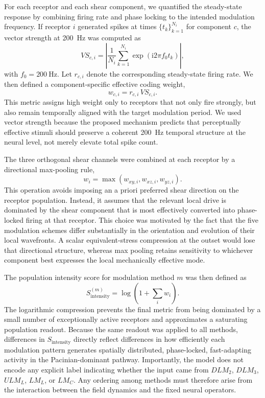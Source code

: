 \documentclass[pdflatex, sn-nature]{sn-jnl}
\theoremstyle{thmstyleone}%
\theoremstyle{thmstyletwo}%
\theoremstyle{thmstylethree}%
\begin{document}
For each receptor and each shear component, we quantified the steady-state response by combining firing rate and phase locking to the intended modulation frequency. If receptor $i$ generated spikes at times $\{t_k\}_{k=1}^{N_i}$ for component $c$, the vector strength at \qty{200}{\hertz} was computed as
\begin{equation}
    VS_{c,i}=\left|\frac{1}{N_i}\sum_{k=1}^{N_i} \exp\!\left(\mathrm{i}2\pi f_0 t_k\right)\right|,
\end{equation}
with $f_0=\qty{200}{\hertz}$. Let $r_{c,i}$ denote the corresponding steady-state firing rate. We then defined a component-specific effective coding weight,
\begin{equation}
    w_{c,i}=r_{c,i}\,VS_{c,i}.
\end{equation}
This metric assigns high weight only to receptors that not only fire strongly, but also remain temporally aligned with the target modulation period. We used vector strength because the proposed mechanism predicts that perceptually effective stimuli should preserve a coherent \qty{200}{\hertz} temporal structure at the neural level, not merely elevate total spike count.

The three orthogonal shear channels were combined at each receptor by a directional max-pooling rule,
\begin{equation}
    w_i=\max\left(w_{xy,i},w_{xz,i},w_{yz,i}\right).
\end{equation}
This operation avoids imposing an a priori preferred shear direction on the receptor population. Instead, it assumes that the relevant local drive is dominated by the shear component that is most effectively converted into phase-locked firing at that receptor. This choice was motivated by the fact that the five modulation schemes differ substantially in the orientation and evolution of their local wavefronts. A scalar equivalent-stress compression at the outset would lose that directional structure, whereas max pooling retains sensitivity to whichever component best expresses the local mechanically effective mode.

The population intensity score for modulation method $m$ was then defined as
\begin{equation}
    S^{(m)}_{\mathrm{intensity}}=\log\!\left(1+\sum_i w_i\right).
\end{equation}
The logarithmic compression prevents the final metric from being dominated by a small number of exceptionally active receptors and approximates a saturating population readout. Because the same readout was applied to all methods, differences in $S_{\mathrm{intensity}}$ directly reflect differences in how efficiently each modulation pattern generates spatially distributed, phase-locked, fast-adapting activity in the Pacinian-dominant pathway. Importantly, the model does not encode any explicit label indicating whether the input came from $DLM_2$, $DLM_3$, $ULM_L$, $LM_L$, or $LM_C$. Any ordering among methods must therefore arise from the interaction between the field dynamics and the fixed neural operators.
\end{document}
